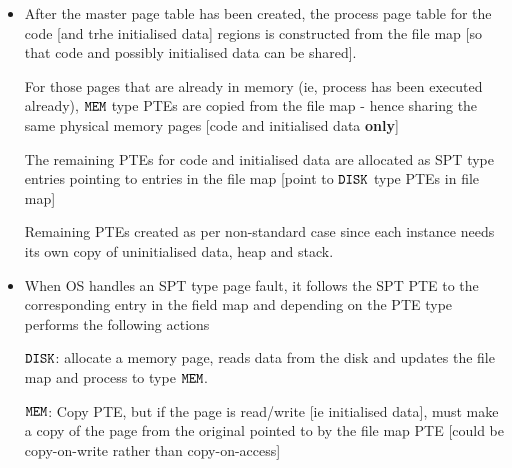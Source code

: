 \documentclass[a4paper,12pt]{article}
\begin{document}
\begin{itemize}

\item After the master page table has been created, the process page table for
the code [and trhe initialised data] regions is constructed from the
file map [so that code and possibly initialised data can be shared].

\subitem For those pages that are already in memory (ie, process has been
executed already), $\verb!MEM!$ type PTEs are copied from the file map -
hence sharing the same physical memory pages [code and initialised data
\textbf{only}]

\subitem The remaining PTEs for code and initialised data are allocated as SPT
type entries pointing to entries in the file map [point to $\verb!DISK!$
type PTEs in file map]

\subitem Remaining PTEs created as per non-standard case since each
instance needs its own copy of uninitialised data, heap and stack.

\item When OS handles an SPT type page fault, it follows the SPT PTE to
the corresponding entry in the field map and depending on the PTE type
performs the following actions

\subitem $\verb!DISK!$: allocate a memory page, reads data from the disk
and updates the file map and process to type $\verb!MEM!$.

\subitem $\verb!MEM!$: Copy PTE, but if the page is read/write [ie
initialised data], must make a copy of the page from the original
pointed to by the file map PTE [could be copy-on-write rather than
copy-on-access]

\end{itemize}
\end{document}
